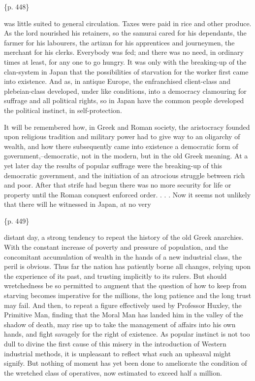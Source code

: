 \{p. 448\}

was little suited to general circulation. Taxes were paid in rice and other produce. As the lord nourished his retainers, so the samurai cared for his dependants, the farmer for his labourers, the artizan for his apprentices and journeymen, the merchant for his clerks. Everybody was fed; and there was no need, in ordinary times at least, for any one to go hungry. It was only with the breaking-up of the clan-system in Japan that the possibilities of starvation for the worker first came into existence. And as, in antique Europe, the enfranchised client-class and plebeian-class developed, under like conditions, into a democracy clamouring for suffrage and all political rights, so in Japan have the common people developed the political instinct, in self-protection.

It will be remembered how, in Greek and Roman society, the aristocracy founded upon religious tradition and military power had to give way to an oligarchy of wealth, and how there subsequently came into existence a democratic form of government,--democratic, not in the modern, but in the old Greek meaning. At a yet later day the results of popular suffrage were the breaking-up of this democratic government, and the initiation of an atrocious struggle between rich and poor. After that strife had begun there was no more security for life or property until the Roman conquest enforced order. . . . Now it seems not unlikely that there will he witnessed in Japan, at no very

\{p. 449\}

distant day, a strong tendency to repeat the history of the old Greek anarchies. With the constant increase of poverty and pressure of population, and the concomitant accumulation of wealth in the hands of a new industrial class, the peril is obvious. Thus far the nation has patiently borne all changes, relying upon the experience of its past, and trusting implicitly to its rulers. But should wretchedness be so permitted to augment that the question of how to keep from starving becomes imperative for the millions, the long patience and the long trust may fail. And then, to repeat a figure effectively used by Professor Huxley, the Primitive Man, finding that the Moral Man has landed him in the valley of the shadow of death, may rise up to take the management of affairs into his own hands, and fight savagely for the right of existence. As popular instinct is not too dull to divine the first cause of this misery in the introduction of Western industrial methods, it is unpleasant to reflect what such an upheaval might signify. But nothing of moment has yet been done to ameliorate the condition of the wretched class of operatives, now estimated to exceed half a million.



